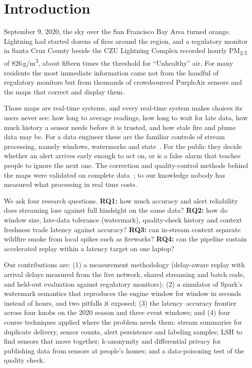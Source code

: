 \documentclass[10pt,journal,compsoc]{IEEEtran}
\newcommand{\ugm}{\,\textmu g/m\textsuperscript{3}}
\begin{document}
\maketitle
\IEEEdisplaynontitleabstractindextext
\IEEEpeerreviewmaketitle

\section{Introduction}
 September 9, 2020, the sky over the San Francisco Bay Area turned orange. Lightning had started dozens of fires around the region, and a regulatory monitor in Santa Cruz County beside the CZU Lightning Complex recorded hourly PM\textsubscript{2.5} of 826\ugm, about fifteen times the threshold for ``Unhealthy'' air. For many residents the most immediate information came not from the handful of regulatory monitors but from thousands of crowdsourced PurpleAir sensors and the maps that correct and display them.

Those maps are real-time systems, and every real-time system makes choices its users never see: how long to average readings, how long to wait for late data, how much history a sensor needs before it is trusted, and how stale fire and plume data may be. For a data engineer these are the familiar controls of stream processing, namely windows, watermarks and state~\cite{akidau2015dataflow}. For the public they decide whether an alert arrives early enough to act on, or is a false alarm that teaches people to ignore the next one. The correction and quality-control methods behind the maps were validated on complete data~\cite{barkjohn2021,barkjohn2022}; to our knowledge nobody has measured what processing in real time costs.

We ask four research questions. \textbf{RQ1:} how much accuracy and alert reliability does streaming lose against full hindsight on the same data? \textbf{RQ2:} how do window size, late-data tolerance (watermark), quality-check history and context freshness trade latency against accuracy? \textbf{RQ3:} can in-stream context separate wildfire smoke from local spikes such as fireworks? \textbf{RQ4:} can the pipeline sustain accelerated replay within a latency target on one laptop?

Our contributions are: (1) a measurement methodology (delay-aware replay with arrival delays measured from the live network, shared streaming and batch code, and held-out evaluation against regulatory monitors); (2) a simulator of Spark's watermark semantics that reproduces the engine window for window in seconds instead of hours, and two pitfalls it exposed; (3) the latency--accuracy frontier across four knobs on the 2020 season and three event windows; and (4) four course techniques applied where the problem needs them: stream summaries for duplicate delivery, sensor counts, alert persistence and labeling samples; LSH to find sensors that move together; k-anonymity and differential privacy for publishing data from sensors at people's homes; and a data-poisoning test of the quality check.
\end{document}
